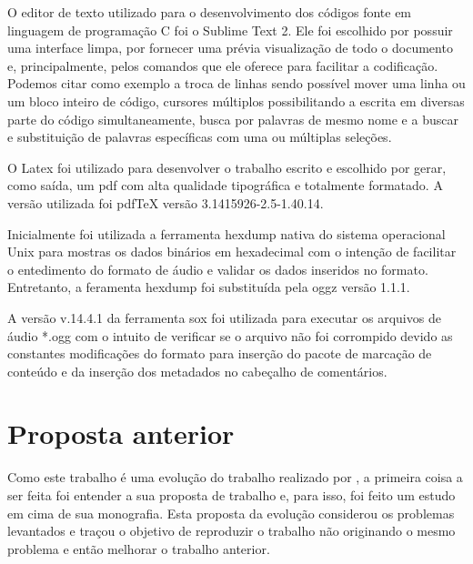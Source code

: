 O editor de texto utilizado para o desenvolvimento dos códigos fonte em linguagem de programação C foi o Sublime Text 2. Ele foi escolhido por possuir uma interface limpa, por fornecer uma prévia visualização de todo o documento e, principalmente, pelos comandos que ele oferece para facilitar a codificação. Podemos citar como exemplo a troca de linhas sendo possível mover uma linha ou um bloco inteiro de código, cursores múltiplos possibilitando a escrita em diversas parte do código simultaneamente, busca por palavras de mesmo nome e a buscar e substituição de palavras específicas com uma ou múltiplas seleções.

O Latex foi utilizado para desenvolver o trabalho escrito e escolhido por gerar, como saída, um pdf com alta qualidade tipográfica e totalmente formatado. A versão utilizada foi pdfTeX versão 3.1415926-2.5-1.40.14.

Inicialmente foi utilizada a ferramenta hexdump nativa do sistema operacional Unix para mostras os dados binários em hexadecimal com o intenção de facilitar o entedimento do formato de áudio e validar os dados inseridos no formato. Entretanto, a feramenta hexdump foi substituída pela oggz versão 1.1.1. 

A versão v.14.4.1 da ferramenta sox foi utilizada para executar os arquivos de áudio *.ogg com o intuito de verificar se o arquivo não foi corrompido devido as constantes modificações do formato para inserção do pacote de marcação de conteúdo e da inserção dos metadados no cabeçalho de comentários.

\section{Proposta anterior}

Como este trabalho é uma evolução do trabalho realizado por \cite{herbert}, a primeira coisa a ser feita foi entender a sua proposta de trabalho e, para isso, foi feito um estudo em cima de sua monografia. Esta proposta da evolução considerou os problemas levantados e traçou o objetivo de reproduzir o trabalho não originando o mesmo problema e então melhorar o trabalho anterior.



